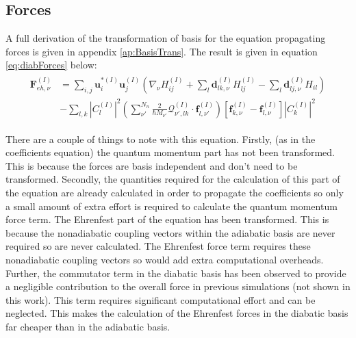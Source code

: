 \subsection{Forces}
A full derivation of the transformation of basis for the equation propagating forces is given in appendix \ref{ap:BasisTrans}. The result is given in equation \eqref{eq:diabForces} below:
\begin{align}
  \begin{split}
	  \mathbf{F}_{eh, \nu}^{(I)} &= \sum_{i,j} \mathbf{u}_{i}^{*(I)} \mathbf{u}_{j}^{(I)} \left( \nabla_{\nu} H_{ij}^{(I)} + \sum_{l} \mathbf{d}_{lk, \nu}^{(I)} H_{lj}^{(I)} - \sum_{l} \mathbf{d}_{lj, \nu}^{(I)} H_{il} \right) \\
	  &- \sum_{l,k} |C_{l}^{(I)}|^2 \left( \sum_{\nu'}^{N_{n}} \frac{2}{\hbar M_{\nu'}} \mathcal{Q}_{\nu', lk}^{(I)} \cdot                   \mathbf{f}_{l, \nu'}^{(I)} \right)\left[ \mathbf{f}_{k, \nu}^{(I)} -          \mathbf{f}_{l, \nu}^{(I)} \right] |C_{k}^{(I)}|^2
	\end{split}
  \label{eq:diabForces}
\end{align}

\noindent There are a couple of things to note with this equation. Firstly, (as in the coefficients equation) the quantum momentum part has not been transformed. This is because the forces are basis independent and don't need to be transformed. Secondly, the quantities required for the calculation of this part of the equation are already calculated in order to propagate the coefficients so only a small amount of extra effort is required to calculate the quantum momentum force term. The Ehrenfest part of the equation has been transformed. This is because the nonadiabatic coupling vectors within the adiabatic basis are never required so are never calculated. The Ehrenfest force term requires these nonadiabatic coupling vectors so would add extra computational overheads. Further, the commutator term in the diabatic basis has been observed to provide a negligible contribution to the overall force in previous simulations (not shown in this work). This term requires significant computational effort and can be neglected. This makes the calculation of the Ehrenfest forces in the diabatic basis far cheaper than in the adiabatic basis.

